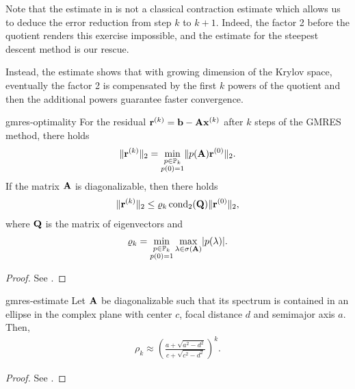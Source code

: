 \begin{remark}
  Note that the estimate in 
  is not a classical contraction estimate which allows us to deduce
  the error reduction from step $k$ to $k+1$. Indeed, the factor 2
  before the quotient renders this exercise impossible, and the
  estimate for the steepest descent method is our rescue.

  Instead, the estimate shows that with growing dimension of the
  Krylov space, eventually the factor 2 is compensated by the first
  $k$ powers of the quotient and then the additional powers guarantee
  faster convergence.
\end{remark}


\begin{Theorem}{gmres-optimality}
  For the residual $\mathbf r^{(k)} = \mathbf b-\mathbf A\mathbf x^{(k)}$ after $k$ steps of
  the GMRES method, there holds
  \begin{gather}
    \lVert\mathbf r^{(k)}\rVert_2 = \min_{\substack{p\in\mathbb P_k\\p(0) = 1}}
    \lVert p(\mathbf A)\mathbf r^{(0)}\rVert_2.
  \end{gather}
  If the matrix $\mathbf A$ is diagonalizable, then there holds
    \begin{gather}
    \lVert\mathbf r^{(k)}\rVert_2 \le \varrho_k \operatorname{cond}_2(\mathbf Q) \lVert\mathbf r^{(0)}\rVert_2,
  \end{gather}
  where $\mathbf Q$ is the matrix of eigenvectors and
  \begin{gather}
    \varrho_k = \min_{\substack{p\in\mathbb P_k\\p(0) = 1}} \max_{\lambda\in\sigma(\mathbf A)} \lvert p(\lambda)\rvert.
  \end{gather}
\end{Theorem}

\begin{proof}
  See \cite[Proposition 6.32]{Saad00}.
\end{proof}

\begin{Corollary}{gmres-estimate}
  Let $\mathbf A$ be diagonalizable such that its spectrum is contained in
  an ellipse in the complex plane with center $c$, focal distance $d$
  and semimajor axis $a$. Then,
  \begin{gather}
     \rho_k \approx \left(
      \frac{a+\sqrt{a^2-d^2}}{c+\sqrt{c^2-d^2}}
      \right)^k.
  \end{gather}
\end{Corollary}

\begin{proof}
  See \cite[Corollary 6.33]{Saad00}.
\end{proof}


